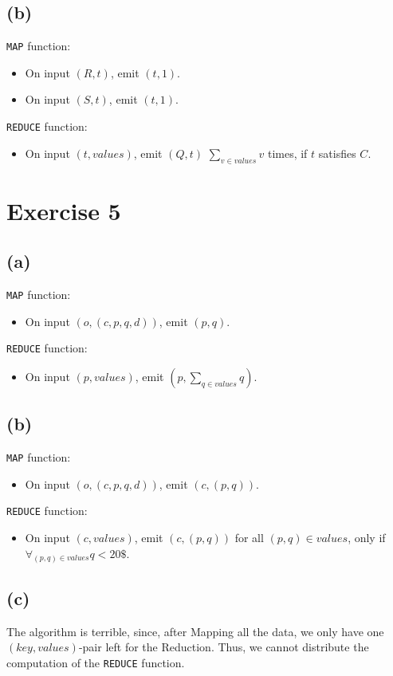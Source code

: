 \documentclass[12pt]{article}
\begin{document}
\subsection*{(b)}
\verb|MAP| function:
\begin{itemize}
	\item	On input $(R, t)$, emit $(t,1)$.
	\item	On input $(S, t)$, emit $(t,1)$.
\end{itemize}
\verb|REDUCE| function:
\begin{itemize}
	\item	On input $(t, values)$, emit $(Q,t)$ $\sum_{v \in values} v$ times, if $t$ satisfies $C$.
\end{itemize}

\section*{Exercise 5}
\subsection*{(a)}
\verb|MAP| function:
\begin{itemize}
	\item	On input $(o, (c,p,q,d))$, emit $(p,q)$.
\end{itemize}
\verb|REDUCE| function:
\begin{itemize}
	\item	On input $(p, values)$, emit $(p,\sum_{q \in values} q)$.
\end{itemize}

\subsection*{(b)}
\verb|MAP| function:
\begin{itemize}
	\item	On input $(o, (c,p,q,d))$, emit $(c,(p,q))$.
\end{itemize}
\verb|REDUCE| function:
\begin{itemize}
	\item	On input $(c, values)$, emit $(c,(p,q))$ for all $(p,q) \in values$, only if $\forall_{(p,q) \in values} q < 20\$$.
\end{itemize}

\subsection*{(c)}
The algorithm is terrible, since, after Mapping all the data, we only have one $(key, values)$-pair left for the Reduction. Thus, we cannot distribute the computation of the \verb|REDUCE| function.
\end{document}
